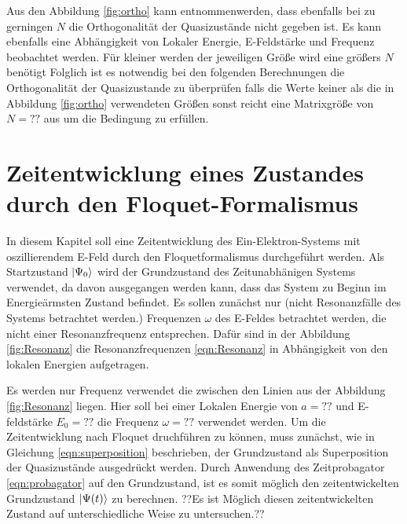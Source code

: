 
Aus den Abbildung \ref{fig:ortho} kann entnommenwerden, dass ebenfalls bei zu gerningen $N$ die Orthogonalität der Quasizustände
nicht gegeben ist. Es kann ebenfalls eine Abhängigkeit von Lokaler Energie, E-Feldstärke und Frequenz beobachtet werden.
Für kleiner werden der jeweiligen Größe wird eine größers $N$ benötigt
Folglich ist es notwendig bei den folgenden Berechnungen die Orthogonalität der Quasizustande zu überprüfen falls
die Werte keiner als die in Abbildung \ref{fig:ortho} verwendeten Größen sonst reicht eine Matrixgröße von $N=??$
aus um die Bedingung zu erfüllen.



\section{Zeitentwicklung eines Zustandes durch den Floquet-Formalismus}
In diesem Kapitel soll eine Zeitentwicklung des Ein-Elektron-Systems mit oszillierendem E-Feld durch den Floquetformalismus durchgeführt werden.
Als Startzustand $\ket{\Psi_0}$ wird der Grundzustand des Zeitunabhänigen Systems verwendet, da davon
ausgegangen werden kann, dass das System zu Beginn im Energieärmsten Zustand befindet.
Es sollen zunächst nur (nicht Resonanzfälle des Systems betrachtet werden.) Frequenzen $\omega$ des E-Feldes
betrachtet werden, die nicht einer Resonanzfrequenz entsprechen. Dafür
sind in der Abbildung \ref{fig:Resonanz} die Resonanzfrequenzen \eqref{eqn:Resonanz} in Abhängigkeit
von den lokalen Energien aufgetragen.


Es werden nur Frequenz verwendet die zwischen den Linien aus der Abbildung \ref{fig:Resonanz} liegen. Hier soll bei einer Lokalen Energie
von $a=??$ und E-feldstärke $E_0=??$  die Frequenz $\omega=??$ verwendet werden.
Um die Zeitentwicklung nach Floquet druchführen zu können, muss
zunächst, wie in Gleichung \ref{eqn:superposition} beschrieben, der Grundzustand
als Superposition der Quasizustände ausgedrückt werden.
Durch Anwendung des Zeitprobagator \eqref{eqn:probagator} auf den Grundzustand, ist es somit möglich den zeitentwickelten Grundzustand
$\ket{\Psi(t)}$ zu berechnen.
??Es ist Möglich diesen zeitentwickelten Zustand auf unterschiedliche Weise zu untersuchen.??


